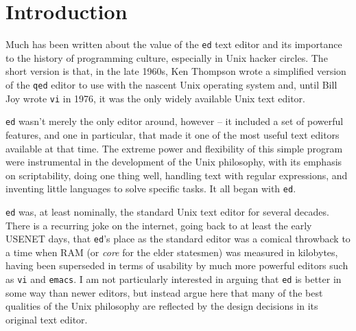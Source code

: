 \documentclass[12pt]{article}
\begin{document}
\maketitle

\begin{abstract}
\end{abstract}

\section{Introduction}

Much has been written about the value of the \lstinline{ed} text editor
and its importance to the history of programming culture, especially
in Unix hacker circles. The short version is that, in the late 1960s,
Ken Thompson wrote a simplified version of the \lstinline{qed} editor
to use with the nascent Unix operating system and, until Bill Joy
wrote \lstinline{vi} in 1976, it was the only widely available Unix
text editor.

\lstinline{ed} wasn't merely the only editor around, however --
it included a set of powerful features, and one in particular,
that made it one of the most useful text editors available at
that time. The extreme power and flexibility of this simple
program were instrumental in the development of the Unix philosophy,
with its emphasis on scriptability, doing one thing well, handling
text with regular expressions, and inventing little languages
to solve specific tasks. It all began with \lstinline{ed}.

\lstinline{ed} was, at least nominally, the standard Unix text editor
for several decades.
There is a recurring joke on the internet, going back to at least the early
USENET days,
that \lstinline{ed}'s place as the standard editor was a comical throwback
to a time when RAM (or \emph{core} for the elder statesmen) was measured
in kilobytes, having been superseded in terms of usability by much more
powerful editors such as \lstinline{vi} and \lstinline{emacs}.
I am not particularly interested in arguing that \lstinline{ed} is better
in some way than newer editors, but instead argue here that many of the
best qualities of the Unix philosophy are reflected by the design decisions
in its original text editor.
\end{document}
